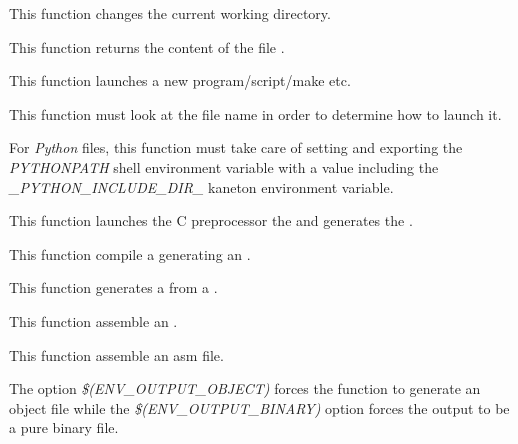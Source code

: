          {
	   This function changes the current working directory.
	 }

         {
	   This function returns the content of the file .
	 }

         {
	   This function launches a new program/script/make etc.

	   \-

	   This function must look at the file name in order to determine
	   how to launch it.

	   \-

	   For \textit{Python} files, this function must take care of
	   setting and exporting the \textit{PYTHONPATH} shell environment
	   variable with a value including the
	   \textit{\_PYTHON\_INCLUDE\_DIR\_} kaneton environment variable.
	 }

         {
	   This function launches the C preprocessor the 
	   and generates the .
	 }

         {
	   This function compile a  generating an
	   .
	 }

         {
	   This function generates a  from a
	   .
	 }

         {
	   This function assemble an .
	 }

         {
	   This function assemble an asm file.

	   \-

	   The option \textit{\$(ENV\_OUTPUT\_OBJECT)} forces the function
	   to generate an object file while the
	   \textit{\$(ENV\_OUTPUT\_BINARY)} option forces the output to be
	   a pure binary file.
	 }

